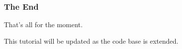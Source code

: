 \documentclass[utf8,10pt]{beamer}
\begin{document}
\begin{frame}
\frametitle{The End}


\begin{center}
  {\Large That's all for the moment.}
\end{center}

\vspace{1.0cm}

\begin{center}
  {This tutorial will be updated as the code base is extended.}
\end{center}

\end{frame}
\end{document}
